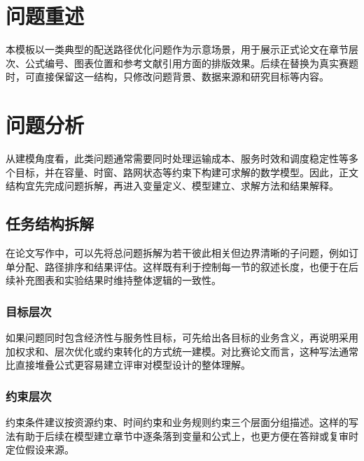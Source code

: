 \section{问题重述}

本模板以一类典型的配送路径优化问题作为示意场景，用于展示正式论文在章节层次、公式编号、图表位置和参考文献引用方面的排版效果。后续在替换为真实赛题时，可直接保留这一结构，只修改问题背景、数据来源和研究目标等内容。\cite{dantzig_ramser_1959,solomon_1987_vrptw}

\section{问题分析}

从建模角度看，此类问题通常需要同时处理运输成本、服务时效和调度稳定性等多个目标，并在容量、时窗、路网状态等约束下构建可求解的数学模型。因此，正文结构宜先完成问题拆解，再进入变量定义、模型建立、求解方法和结果解释。

\subsection{任务结构拆解}

在论文写作中，可以先将总问题拆解为若干彼此相关但边界清晰的子问题，例如订单分配、路径排序和结果评估。这样既有利于控制每一节的叙述长度，也便于在后续补充图表和实验结果时维持整体逻辑的一致性。

\subsubsection{目标层次}

如果问题同时包含经济性与服务性目标，可先给出各目标的业务含义，再说明采用加权求和、层次优化或约束转化的方式统一建模。对比赛论文而言，这种写法通常比直接堆叠公式更容易建立评审对模型设计的整体理解。

\subsubsection{约束层次}

约束条件建议按资源约束、时间约束和业务规则约束三个层面分组描述。这样的写法有助于后续在模型建立章节中逐条落到变量和公式上，也更方便在答辩或复审时定位假设来源。
